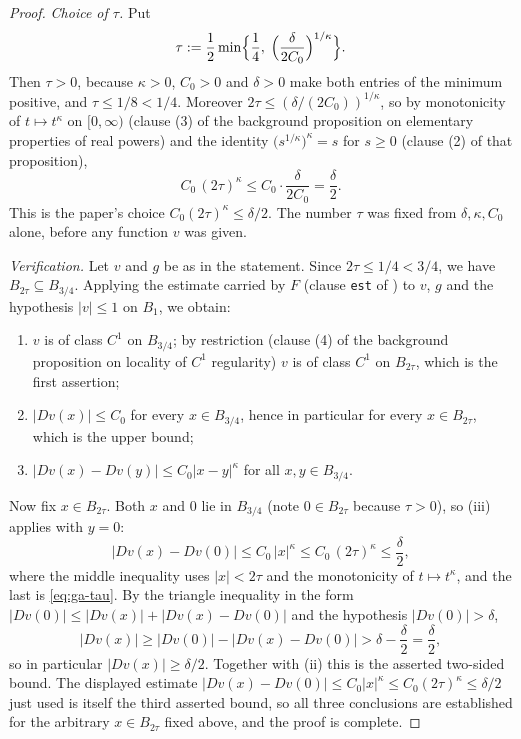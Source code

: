 \begin{proof}
\emph{Choice of $\tau$.}  Put
\[
  \tau:=\frac{1}{2}\min\Bigl\{\frac{1}{4},\;
    \Bigl(\frac{\delta}{2C_0}\Bigr)^{1/\kappa}\Bigr\} .
\]
Then $\tau>0$, because $\kappa>0$, $C_0>0$ and $\delta>0$ make both entries of the minimum
positive, and $\tau\le1/8<1/4$.  Moreover $2\tau\le(\delta/(2C_0))^{1/\kappa}$, so by
monotonicity of $t\mapsto t^{\kappa}$ on $[0,\infty)$ (clause (3) of the background proposition
on elementary properties of real powers) and the identity
$\bigl(s^{1/\kappa}\bigr)^{\kappa}=s$ for $s\ge0$ (clause (2) of that proposition),
\begin{equation}\label{eq:ga-tau}
  C_0\,(2\tau)^{\kappa}\le C_0\cdot\frac{\delta}{2C_0}=\frac{\delta}{2}.
\end{equation}
This is the paper's choice $C_0(2\tau)^{\kappa}\le\delta/2$.  The number $\tau$ was fixed from
$\delta,\kappa,C_0$ alone, before any function $v$ was given.

\emph{Verification.}  Let $v$ and $g$ be as in the statement.  Since $2\tau\le1/4<3/4$, we have
$B_{2\tau}\subseteq B_{3/4}$.  Applying the estimate carried by $F$ (clause \texttt{est} of
) to $v$, $g$ and the hypothesis $\lvert v\rvert\le1$ on
$B_1$, we obtain:
\begin{enumerate}
\item[(i)] $v$ is of class $C^{1}$ on $B_{3/4}$; by restriction (clause (4) of the background
proposition on locality of $C^{1}$ regularity) $v$ is of class $C^{1}$ on $B_{2\tau}$, which is
the first assertion;
\item[(ii)] $\lvert Dv(x)\rvert\le C_0$ for every $x\in B_{3/4}$, hence in particular for every
$x\in B_{2\tau}$, which is the upper bound;
\item[(iii)] $\lvert Dv(x)-Dv(y)\rvert\le C_0\lvert x-y\rvert^{\kappa}$ for all
$x,y\in B_{3/4}$.
\end{enumerate}

Now fix $x\in B_{2\tau}$.  Both $x$ and $0$ lie in $B_{3/4}$ (note $0\in B_{2\tau}$ because
$\tau>0$), so (iii) applies with $y=0$:
\[
  \lvert Dv(x)-Dv(0)\rvert\le C_0\,\lvert x\rvert^{\kappa}\le C_0\,(2\tau)^{\kappa}
  \le\frac{\delta}{2},
\]
where the middle inequality uses $\lvert x\rvert<2\tau$ and the monotonicity of
$t\mapsto t^{\kappa}$, and the last is \eqref{eq:ga-tau}.  By the triangle inequality in the
form $\lvert Dv(0)\rvert\le\lvert Dv(x)\rvert+\lvert Dv(x)-Dv(0)\rvert$ and the hypothesis
$\lvert Dv(0)\rvert>\delta$,
\[
  \lvert Dv(x)\rvert\ge\lvert Dv(0)\rvert-\lvert Dv(x)-Dv(0)\rvert
  >\delta-\frac{\delta}{2}=\frac{\delta}{2},
\]
so in particular $\lvert Dv(x)\rvert\ge\delta/2$.  Together with (ii) this is the asserted
two-sided bound.  The displayed estimate
$\lvert Dv(x)-Dv(0)\rvert\le C_0\lvert x\rvert^{\kappa}\le C_0(2\tau)^{\kappa}\le\delta/2$ just
used is itself the third asserted bound, so all three conclusions are established for the
arbitrary $x\in B_{2\tau}$ fixed above, and the proof is complete.
\end{proof}
